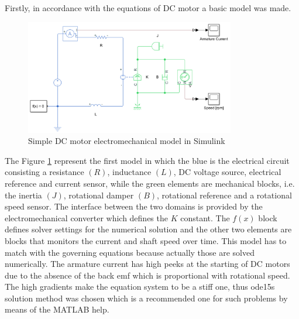 \documentclass[12pt,english]{article}
\begin{document}
Firstly, in accordance with the equations of DC motor a basic model was made.
\begin{figure}[htb!]
	\centering
	\includegraphics[height=5cm]{figures/simulink_dc_motor.png}
	\caption{Simple DC motor electromechanical model in Simulink}
	\label{simulink_dc_motor}
\end{figure}
The Figure \ref{simulink_dc_motor} represent the first model in which the blue is the electrical circuit consisting a resistance $(R)$, inductance $(L)$, DC voltage source, electrical reference and current sensor, while the green elements are mechanical blocks, i.e. the inertia $(J)$, rotational damper $(B)$, rotational reference and a rotational speed sensor. The interface between the two domains is provided by the electromechanical converter which defines the $K$ constant. The $f(x)$ block defines solver settings for the numerical solution and the other two elements are blocks that monitors the current and shaft speed over time. This model has to match with the governing equations because actually those are solved numerically. The armature current has high peeks at the starting of DC motors due to the absence of the back emf which is proportional with rotational speed. The high gradients make the equation system to be a stiff one, thus ode15s solution method was chosen which is a recommended one for such problems by means of the MATLAB help.
\end{document}
